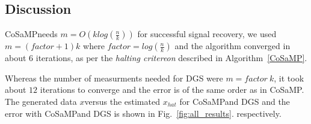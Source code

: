 \documentclass[12pt]{article}
\makeatletter
\theoremstyle{definition}
\def\x{$x$\hspace{0.1in}}
\def\cosamp{CoSaMP\hspace{0.1in}}
\newcounter{eqn}
\renewcommand*{\theeqn}{\alph{eqn})}
\newcommand{\num}{\refstepcounter{eqn}\text{\theeqn}\;}
\newcommand{\putindeepbox}[2][0.7\baselineskip]{{%
    \setbox0=\hbox{#2}%
    \setbox0=\vbox{\noindent\hsize=\wd0\unhbox0}
    \@tempdima=\dp0
    \advance\@tempdima by \ht0
    \advance\@tempdima by -#1\relax
    \dp0=\@tempdima
    \ht0=#1\relax
    \box0
}}
\makeatother
\begin{document}
  \subsection{Discussion}
  \cosamp needs $m=O(klog(\frac{n}{k}))$ for successful signal recovery, we used $m=(factor+1)k$ where
  $factor=log(\frac{n}{k})$ and the algorithm converged in about $6$ iterations, as per the \textit{halting critereon}
  described in Algorithm~\ref{CoSaMP}. 
  \par Whereas the number of measurments needed for DGS were $m=factor \ k$,
  it took about $12$ iterations to converge and the error is of the same order as in \cosamp.
  The generated data \x versus the estimated $x_{hat}$ for \cosamp and DGS
  and the error with \cosamp and DGS is shown in Fig.~\ref{fig:all_results}.
  respectively.
\strut
\end{document}
